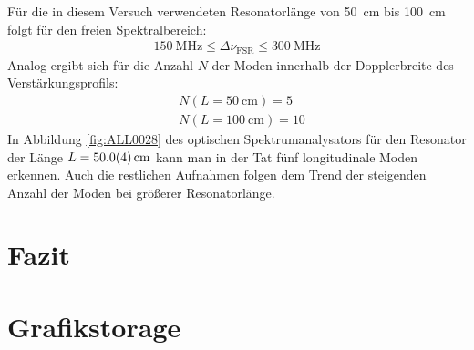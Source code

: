 \documentclass[11pt, a4paper]{article}
\numberwithin{equation}{section}
\begin{document}
Für die in diesem Versuch verwendeten Resonatorlänge von \SI{50}{\centi\metre} bis \SI{100}{\centi\metre} folgt für den freien Spektralbereich:
\begin{align}
\SI{150}{\mega\hertz} \le \Delta \nu_\mathrm{FSR} \le \SI{300}{\mega\hertz}
\end{align}
Analog ergibt sich für die Anzahl $N$ der Moden innerhalb der Dopplerbreite des Verstärkungsprofils:
\begin{align}
	&N(L = \SI{50}{\centi\metre}) = 5 \\
	&N(L = \SI{100}{\centi\metre}) = 10
\end{align}
In Abbildung \ref{fig:ALL0028} des optischen Spektrumanalysators für den Resonator der Länge $L = \SI{50 +- 0.4}{\centi\metre}$ kann man in der Tat fünf longitudinale Moden erkennen.
Auch die restlichen Aufnahmen folgen dem Trend der steigenden Anzahl der Moden bei größerer Resonatorlänge.



\section{Fazit}

\section{Grafikstorage}
\end{document}
